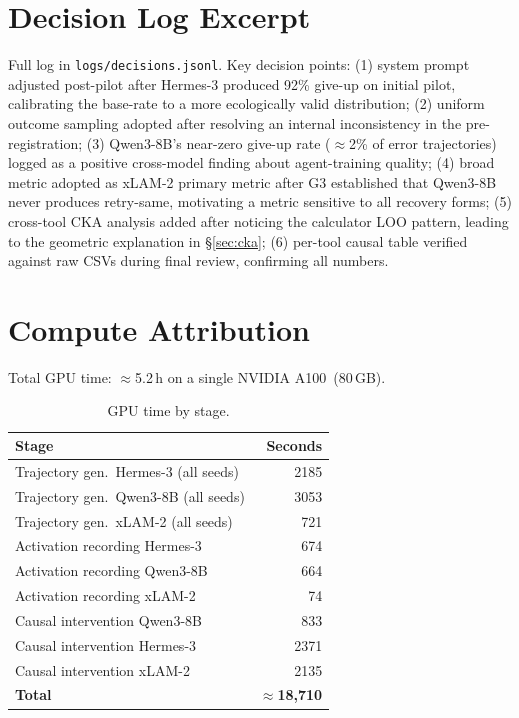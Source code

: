 \documentclass{article}
\begin{document}
\section{Decision Log Excerpt}
\label{app:decisions}

Full log in \texttt{logs/decisions.jsonl}.  Key decision points:
(1) system prompt adjusted post-pilot after Hermes-3 produced 92\%
give-up on initial pilot, calibrating the base-rate to a more
ecologically valid distribution;
(2) uniform outcome sampling adopted after resolving an internal
inconsistency in the pre-registration;
(3) Qwen3-8B's near-zero give-up rate ($\approx$2\% of error
trajectories) logged as a positive cross-model finding about
agent-training quality;
(4) broad metric adopted as xLAM-2 primary metric after G3
established that Qwen3-8B never produces retry-same, motivating a
metric sensitive to all recovery forms;
(5) cross-tool CKA analysis added after noticing the calculator
LOO pattern, leading to the geometric explanation in \S\ref{sec:cka};
(6) per-tool causal table verified against raw CSVs during final
review, confirming all numbers.

\section{Compute Attribution}
\label{app:compute}

Total GPU time: $\approx$5.2\,h on a single NVIDIA A100~(80\,GB).

\begin{table}[h]
\caption{GPU time by stage.}
\centering\small
\begin{tabular}{lr}
\toprule
Stage & Seconds \\
\midrule
Trajectory gen.\ Hermes-3 (all seeds) & 2185 \\
Trajectory gen.\ Qwen3-8B (all seeds) & 3053 \\
Trajectory gen.\ xLAM-2 (all seeds) & 721 \\
Activation recording Hermes-3 & 674 \\
Activation recording Qwen3-8B & 664 \\
Activation recording xLAM-2 & 74 \\
Causal intervention Qwen3-8B & 833 \\
Causal intervention Hermes-3 & 2371 \\
Causal intervention xLAM-2 & 2135 \\
\midrule
\textbf{Total} & \textbf{$\approx$18,710} \\
\bottomrule
\end{tabular}
\end{table}
\end{document}
